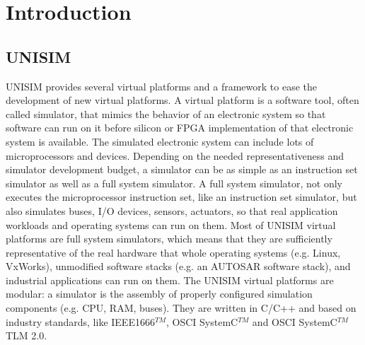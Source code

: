 \section{Introduction}

\subsection{UNISIM}

UNISIM provides several virtual platforms and a framework to ease the development of new virtual platforms. A virtual platform is a software tool, often called simulator, that mimics the behavior of an electronic system so that software can run on it before silicon or FPGA implementation of that electronic system is available. The simulated electronic system can include lots of microprocessors and devices.
Depending on the needed representativeness and simulator development budget, a simulator can be as simple as an instruction set simulator as well as a full system simulator. A full system simulator, not only executes the microprocessor instruction set, like an instruction set simulator, but also simulates buses, I/O devices, sensors, actuators, so that real application workloads and operating systems can run on them. Most of UNISIM virtual platforms are full system simulators, which means that they are sufficiently representative of the real hardware that whole operating systems (e.g. Linux, VxWorks), unmodified software stacks (e.g. an AUTOSAR software stack), and industrial applications can run on them.
The UNISIM virtual platforms are modular: a simulator is the assembly of properly configured simulation components (e.g. CPU, RAM, buses). They are written in C/C++ and based on industry standards, like IEEE1666$^{TM}$, OSCI SystemC$^{TM}$ and OSCI SystemC$^{TM}$ TLM 2.0.

